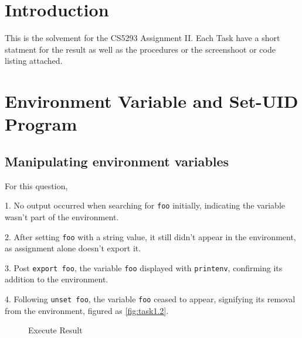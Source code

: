 \documentclass[a4paper,11pt]{article}
\begin{document}

{\hypersetup{hidelinks}
\tableofcontents
}
\newpage
\section{Introduction}
This is the solvement for the CS5293 Assignment II. Each Task have a short statment for the result as well as the procedures or the screenshoot or code listing attached.

\section{Environment Variable and Set-UID Program}

\subsection{Manipulating environment variables}\label{sec:task1}

For this question, 

1. No output occurred when searching for \verb|foo| initially, indicating the variable wasn't part of the environment.

2. After setting \verb|foo| with a string value, it still didn't appear in the environment, as assignment alone doesn't export it.

3. Post \verb|export foo|, the variable \verb|foo| displayed with \verb|printenv|, confirming its addition to the environment.

4. Following \verb|unset foo|, the variable \verb|foo| ceased to appear, signifying its removal from the environment, figured as \ref{fig:task1.2}. 

\begin{figure}[h]
    \centering
    \hfill
    \hfill
    \caption{Execute Result}\label{fig:task1}
\end{figure}
\end{document}
